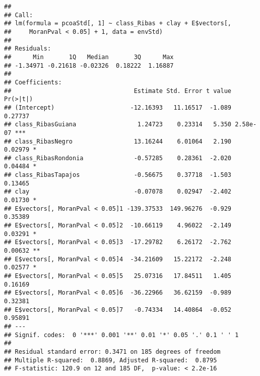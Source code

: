 \documentclass[]{article}
\newenvironment{Shaded}{\begin{snugshade}}{\end{snugshade}}
\newcommand{\CharTok}[1]{\textcolor[rgb]{0.31,0.60,0.02}{#1}}
\newcommand{\CommentTok}[1]{\textcolor[rgb]{0.56,0.35,0.01}{\textit{#1}}}
\newcommand{\DataTypeTok}[1]{\textcolor[rgb]{0.13,0.29,0.53}{#1}}
\newcommand{\DecValTok}[1]{\textcolor[rgb]{0.00,0.00,0.81}{#1}}
\newcommand{\FloatTok}[1]{\textcolor[rgb]{0.00,0.00,0.81}{#1}}
\newcommand{\KeywordTok}[1]{\textcolor[rgb]{0.13,0.29,0.53}{\textbf{#1}}}
\newcommand{\NormalTok}[1]{#1}
\newcommand{\OperatorTok}[1]{\textcolor[rgb]{0.81,0.36,0.00}{\textbf{#1}}}
\newcommand{\StringTok}[1]{\textcolor[rgb]{0.31,0.60,0.02}{#1}}
\begin{document}
\begin{verbatim}
## 
## Call:
## lm(formula = pcoaStd[, 1] ~ class_Ribas + clay + E$vectors[, 
##     MoranPval < 0.05] + 1, data = envStd)
## 
## Residuals:
##      Min       1Q   Median       3Q      Max 
## -1.34971 -0.21618 -0.02326  0.18222  1.16887 
## 
## Coefficients:
##                                  Estimate Std. Error t value Pr(>|t|)    
## (Intercept)                     -12.16393   11.16517  -1.089  0.27737    
## class_RibasGuiana                 1.24723    0.23314   5.350 2.58e-07 ***
## class_RibasNegro                 13.16244    6.01064   2.190  0.02979 *  
## class_RibasRondonia              -0.57285    0.28361  -2.020  0.04484 *  
## class_RibasTapajos               -0.56675    0.37718  -1.503  0.13465    
## clay                             -0.07078    0.02947  -2.402  0.01730 *  
## E$vectors[, MoranPval < 0.05]1 -139.37533  149.96276  -0.929  0.35389    
## E$vectors[, MoranPval < 0.05]2  -10.66119    4.96022  -2.149  0.03291 *  
## E$vectors[, MoranPval < 0.05]3  -17.29782    6.26172  -2.762  0.00632 ** 
## E$vectors[, MoranPval < 0.05]4  -34.21609   15.22172  -2.248  0.02577 *  
## E$vectors[, MoranPval < 0.05]5   25.07316   17.84511   1.405  0.16169    
## E$vectors[, MoranPval < 0.05]6  -36.22966   36.62159  -0.989  0.32381    
## E$vectors[, MoranPval < 0.05]7   -0.74334   14.40864  -0.052  0.95891    
## ---
## Signif. codes:  0 '***' 0.001 '**' 0.01 '*' 0.05 '.' 0.1 ' ' 1
## 
## Residual standard error: 0.3471 on 185 degrees of freedom
## Multiple R-squared:  0.8869, Adjusted R-squared:  0.8795 
## F-statistic: 120.9 on 12 and 185 DF,  p-value: < 2.2e-16
\end{verbatim}

\begin{Shaded}
\end{Shaded}
\end{document}
